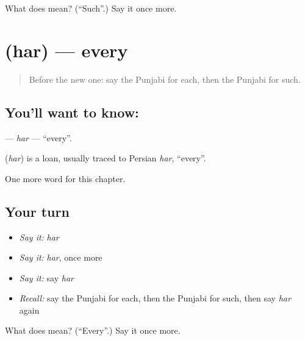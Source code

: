 \begin{tcolorbox}[breakable,colback=teal!4,colframe=teal!35!black,title={Before you move on}]
What does  mean? (\textquotedblleft{}Such\textquotedblright{}.) Say it once more.
\end{tcolorbox}
\section[\texorpdfstring{\pa{ਹਰ} (har)}{ਹਰ (har)}]{ (har) — every}

\label{lesson:PA-C106-har2}



\begin{quote}
Before the new one: say the Punjabi for each, then the Punjabi for such.
\end{quote}

\subsection*{You'll want to know: }
\textbf{} — \emph{har} — \textquotedblleft{}every\textquotedblright{}.

\begin{cousinweb}
\textbf{} (\emph{har}) is a loan, usually traced to Persian \emph{har}, \textquotedblleft{}every\textquotedblright{}.
\end{cousinweb}

\begin{grammarlens}[title={What you've built}]
One more word for this chapter.
\end{grammarlens}

\subsection*{Your turn}
\begin{itemize}
\raggedright
  \item \emph{Say it:} \emph{har}
  \item \emph{Say it:} \emph{har}, once more
  \item \emph{Say it:} say \emph{har}
  \item \emph{Recall:} say the Punjabi for each, then the Punjabi for such, then say \emph{har} again
\end{itemize}

\begin{tcolorbox}[breakable,colback=teal!4,colframe=teal!35!black,title={Before you move on}]
What does  mean? (\textquotedblleft{}Every\textquotedblright{}.) Say it once more.
\end{tcolorbox}
